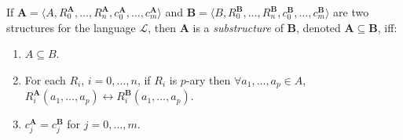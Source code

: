If $\mathbf{A} = \langle A, R_0^{\mathbf{A}}, \ldots, R_n^{\mathbf{A}}, c_0^{\mathbf{A}}, \ldots, c_m^{\mathbf{A}} \rangle$ and
$\mathbf{B} = \langle B, R_0^{\mathbf{B}}, \ldots, R_n^{\mathbf{B}}, c_0^{\mathbf{B}}, \ldots, c_m^{\mathbf{B}} \rangle$
are two structures for the language $\mathcal{L}$, then $\mathbf{A}$ is a \textit{substructure} of $\mathbf{B}$, denoted $\mathbf{A} \subseteq \mathbf{B}$, iff:
\begin{enumerate}
\item $A \subseteq B$.
\item For each $R_i$, $i = 0, \ldots, n$, if $R_i$ is $p$-ary then $\forall a_1, \ldots, a_p \in A$,
$R_i^{\mathbf{A}}(a_1, \ldots, a_p) \leftrightarrow R_i^{\mathbf{B}}(a_1, \ldots, a_p)$.
\item $c_j^{\mathbf{A}} = c_j^{\mathbf{B}}$ for $j = 0, \ldots, m$.
\end{enumerate}
